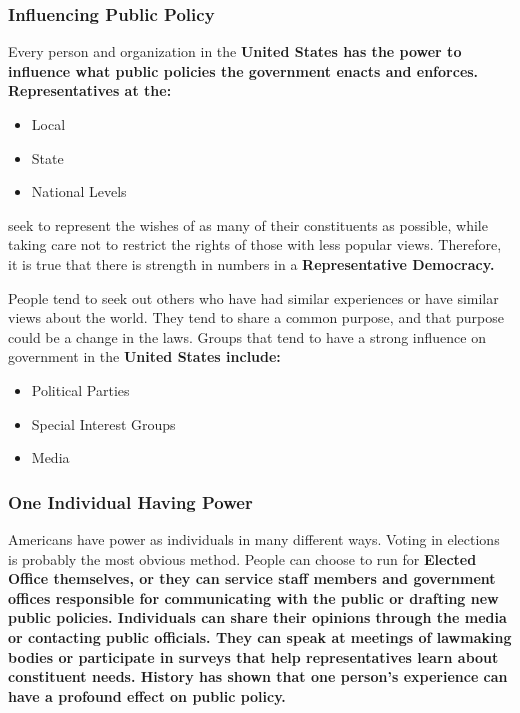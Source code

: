 
\subsubsection*{Influencing Public Policy}

Every person and organization in the \bf{United States} has the power to
influence what public policies the government enacts and enforces.
\bf{Representatives} at the:

\begin{itemize}
    \item Local
    \item State
    \item National Levels
\end{itemize}

seek to represent the wishes of as many of their constituents as possible, while
taking care not to restrict the rights of those with less popular views.
Therefore, it is true that there is strength in numbers in a \bf{Representative
Democracy}.

People tend to seek out others who have had similar experiences or have similar
views about the world. They tend to share a common purpose, and that purpose
could be a change in the laws. Groups that tend to have a strong influence on
government in the \bf{United States} include:

\begin{itemize}
    \item Political Parties
    \item Special Interest Groups
    \item Media
\end{itemize}

\subsubsection*{One Individual Having Power}

Americans have power as individuals in many different ways. Voting in elections
is probably the most obvious method. People can choose to run for \bf{Elected
Office} themselves, or they can service staff members and government offices
responsible for communicating with the public or drafting new public policies.
Individuals can share their opinions through the media or contacting public
officials. They can speak at meetings of lawmaking bodies or participate in
surveys that help representatives learn about constituent needs. History has
shown that one person's experience can have a profound effect on public policy.

